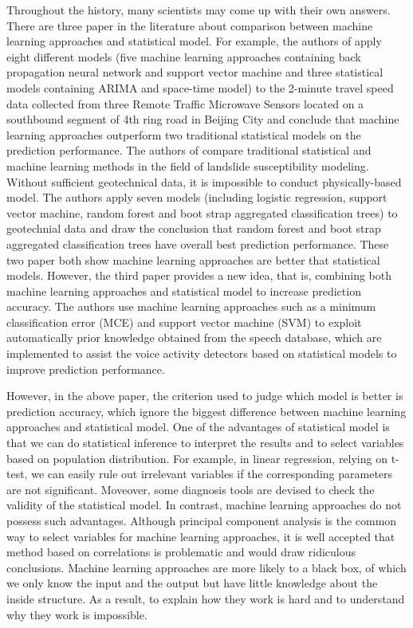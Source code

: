 \documentclass[12pt]{article}
\begin{document}
Throughout the history, many scientists may come up with their own answers. There are three paper in the literature about comparison between machine learning approaches and statistical model. For example, the authors of \cite{jiang2016short} apply eight different models (five machine learning approaches containing back propagation neural network and support vector machine and three statistical models containing ARIMA and space-time model) to the 2-minute travel speed data collected from three Remote Traffic Microwave Sensors located on a southbound segment of 4th ring road in Beijing City and conclude that machine learning approaches outperform two traditional statistical models on the prediction performance. The authors of \cite{goetz2015evaluating} compare traditional statistical and machine learning methods in the field of landslide susceptibility modeling. Without sufficient geotechnical data, it is impossible to conduct physically-based model. The authors apply seven models (including logistic regression, support vector machine, random forest and boot strap aggregated classification trees) to geotechnial data and draw the conclusion that random forest and boot strap aggregated classification trees have overall best prediction performance. These two paper both show machine learning approaches are better that statistical models. However, the third paper \cite{shin2010voice} provides a new idea, that is, combining both machine learning approaches and statistical model to increase prediction accuracy. The authors use machine learning approaches such as a minimum classification error (MCE) and support vector
machine (SVM) to exploit automatically prior knowledge obtained from the speech database, which are implemented to assist the voice activity detectors based on statistical models to improve prediction performance.

However, in the above paper, the criterion used to judge which model is better is prediction accuracy, which ignore the biggest difference between machine learning approaches and statistical model. One of the advantages of statistical model is that we can do statistical inference to interpret the results and to select variables based on population distribution. For example, in linear regression, relying on t-test, we can easily rule out irrelevant variables if the corresponding parameters are not significant. Moveover, some diagnosis tools are devised to check the validity of the statistical model. In contrast, machine learning approaches do not possess such advantages. Although principal component analysis is the common way to select variables for machine learning approaches, it is well accepted that method based on correlations is problematic and would draw ridiculous conclusions. Machine learning approaches are more likely to a black box, of which we only know the input and the output but have little knowledge about the inside structure. As a result, to explain how they work is hard and to understand why they work is impossible.
\end{document}
